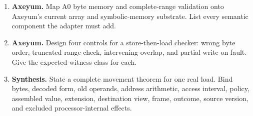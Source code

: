 \begin{enumerate}
\item \textbf{Axeyum.} Map A0 byte memory and complete-range validation onto
Axeyum's current array and symbolic-memory substrate. List every semantic
component the adapter must add.

\item \textbf{Axeyum.} Design four controls for a store-then-load checker:
wrong byte order, truncated range check, intervening overlap, and partial write
on fault. Give the expected witness class for each.

\item \textbf{Synthesis.} State a complete movement theorem for one real load.
Bind bytes, decoded form, old operands, address arithmetic, access interval,
policy, assembled value, extension, destination view, frame, outcome, source
version, and excluded processor-internal effects.
\end{enumerate}
